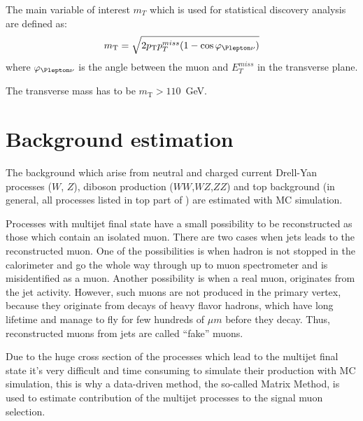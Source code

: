 
The main variable of interest $m_T$ which is used for statistical discovery analysis are defined as:
\begin{equation}
 m_\mathrm{T} = \sqrt{2 p_\mathrm{T} p_T^{miss} (1-\cos\varphi_{\Plepton\nu})}
\end{equation}
where $\varphi_{\Plepton\nu}$ is the angle between the muon and $E_T^{miss}$ in the transverse plane.

The transverse mass has to be $m_\mathrm{T} > 110$~GeV.


\section{Background estimation}
\label{sec:wprime_backgroundEstimation}

The background which arise from neutral and charged current Drell-Yan processes ($W$, $Z$), diboson
production ($WW$,$WZ$,$ZZ$) and top background (in general, all processes listed in top part of ) are estimated with MC simulation.

Processes with multijet final state have a small possibility to be reconstructed as those which contain
an isolated muon. There are two cases when jets leads to the reconstructed muon. One of the possibilities is when hadron is not stopped in the calorimeter and go the whole way through up to muon spectrometer and is misidentified as a muon. Another possibility is when a real muon, originates from the jet activity. However, such muons are not produced in the primary vertex, because they originate from decays of heavy flavor hadrons, which have long lifetime and manage to fly for few hundreds of $\mu m$ before they decay.
Thus, reconstructed muons from jets are called ``fake'' muons.

Due to the huge cross section of the processes which lead to the multijet final state it's very difficult and time consuming to simulate their production with MC simulation, this is why a data-driven method,
the so-called Matrix Method, is used to estimate contribution of the multijet processes to the signal muon selection.

